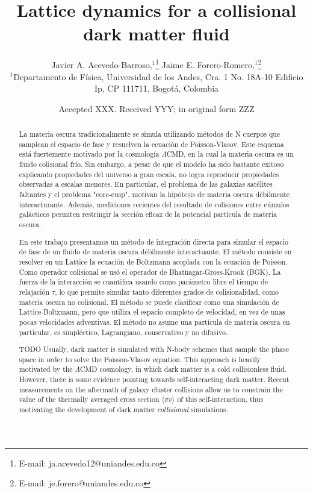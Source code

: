\documentclass[fleqn,usenatbib]{mnras}
\title[Collisional lattice dynamics]{Lattice dynamics for a collisional dark matter fluid}
\author[J. A. Acevedo-Barroso \& J. E. Forero-Romero]{
Javier A. Acevedo-Barroso,$^{1}$\thanks{E-mail: ja.acevedo12@uniandes.edu.co}
Jaime E. Forero-Romero,$^{1}$\thanks{E-mail: je.forero@uniandes.edu.co}
\\
$^{1}$Departamento de F\'isica, Universidad de los Andes, Cra. 1 No. 18A-10 Edificio Ip, CP 111711, Bogot\'a, Colombia\\
}
\date{Accepted XXX. Received YYY; in original form ZZZ}
\newcommand{\crosssection}{\langle \sigma v \rangle}
\begin{document}
\label{firstpage}
\pagerange{\pageref{firstpage}--\pageref{lastpage}}
\maketitle

\begin{abstract}
La materia oscura tradicionalmente se simula utilizando métodos de N cuerpos que samplean el espacio de fase y resuelven la ecuación de Poisson-Vlasov.
Este esquema está fuertemente motivado por la cosmología $\Lambda$CMD, en la cual la materia oscura es un fluido colisional frío.
Sin embargo, a pesar de que el modelo ha sido bastante exitoso explicando propiedades del universo a gran escala, no logra reproducir propiedades observadas a escalas menores.
En particular, el problema de las galaxias satélites faltantes y el problema "core-cusp", motivan la hipótesis de materia oscura débilmente interacturante.
Además, mediciones recientes del resultado de colisiones entre cúmulos galácticos permiten restringir la sección eficaz de la potencial partícula de materia oscura.

En este trabajo presentamos un método de integración directa para simular el espacio de fase de un fluido de materia oscura débilmente interactuante.
El método consiste en resolver en un Lattice la ecuación de Boltzmann acoplada con la ecuación de Poisson.
Como operador colisional se usó el operador de Bhatnagar-Gross-Krook (BGK).
La fuerza de la interacción se cuantifica usando como parámetro libre el tiempo de relajación $\tau$, lo que permite simular tanto diferentes grados de colisionalidad, como materia oscura no colisional.
El método se puede clasificar como una simulación de Lattice-Boltzmann, pero que utiliza el espacio completo de velocidad, en vez de unas pocas velocidades adventivas.
El método no asume una partícula de materia oscura en partícular, es simpléctico, Lagrangiano, conservativo y no difusivo.



TODO
Usually, dark matter is simulated with N-body schemes that sample the phase space in order to solve the Poisson-Vlasov equation. This approach is heavily motivated by the $\Lambda$CMD cosmology, in which dark matter is a cold collisionless fluid.
However, there is some evidence pointing towards self-interacting dark matter. Recent measurements on the aftermath of galaxy cluster collisions allow us to constrain the value of the thermally averaged cross section $\crosssection$ of this self-interaction, thus motivating the development of dark matter \emph{collisional} simulations.


\end{abstract}
\end{document}
